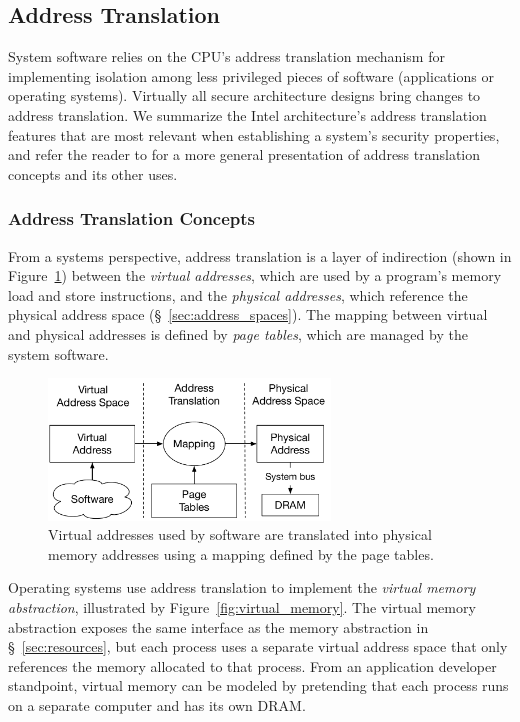 \subsection{Address Translation}
\label{sec:paging}


System software relies on the CPU's address translation mechanism for
implementing isolation among less privileged pieces of software (applications
or operating systems). Virtually all secure architecture designs bring changes
to address translation. We summarize the Intel architecture's address
translation features that are most relevant when establishing a system's
security properties, and refer the reader to \cite{jacob1998virtual} for a more
general presentation of address translation concepts and its other uses.


\subsubsection{Address Translation Concepts}
\label{sec:paging_concepts}
\label{sec:paging_vpn}
\label{sec:paging_ppn}

From a systems perspective, address translation is a layer of indirection
(shown in Figure~\ref{fig:address_translation}) between the
\textit{virtual addresses}, which are used by a program's memory load and store
instructions, and the \textit{physical addresses}, which reference the physical
address space (\S~\ref{sec:address_spaces}). The mapping between virtual and
physical addresses is defined by \textit{page tables}, which are managed by the
system software.

\begin{figure}[hbt]
  \centering
  \includegraphics[width=75mm]{figures/address_translation.pdf}
  \caption{
    Virtual addresses used by software are translated into physical memory
    addresses using a mapping defined by the page tables.
  }
  \label{fig:address_translation}
\end{figure}

Operating systems use address translation to implement the \textit{virtual
memory abstraction}, illustrated by Figure~\ref{fig:virtual_memory}. The
virtual memory abstraction exposes the same interface as the memory abstraction
in \S~\ref{sec:resources}, but each process uses a separate virtual address
space that only references the memory allocated to that process. From an
application developer standpoint, virtual memory can be modeled by pretending
that each process runs on a separate computer and has its own DRAM.

